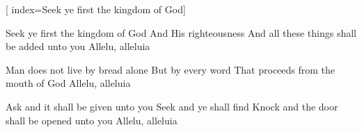 %


[             %
    index={Seek ye first the kingdom of God}]             %

\beginverse                       %

\chordsoff  								%

Seek ye first the kingdom of God
And His righteousness
And all these things shall be added unto you
Allelu, alleluia

\endverse                         %

\beginverse                       %
\chordsoff  								%

Man does not live by bread alone
But by every word
That proceeds from the mouth of God
Allelu, alleluia

\endverse                         %


\beginverse                       %
\chordsoff  								%

Ask and it shall be given unto you
Seek and ye shall find
Knock and the door shall be opened unto you
Allelu, alleluia

